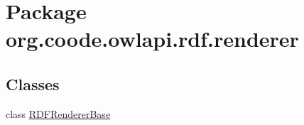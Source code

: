 \hypertarget{namespaceorg_1_1coode_1_1owlapi_1_1rdf_1_1renderer}{\section{Package org.\-coode.\-owlapi.\-rdf.\-renderer}
\label{namespaceorg_1_1coode_1_1owlapi_1_1rdf_1_1renderer}
}
\subsection*{Classes}
\begin{DoxyCompactItemize}
\item 
class \hyperlink{classorg_1_1coode_1_1owlapi_1_1rdf_1_1renderer_1_1_r_d_f_renderer_base}{R\-D\-F\-Renderer\-Base}
\end{DoxyCompactItemize}
